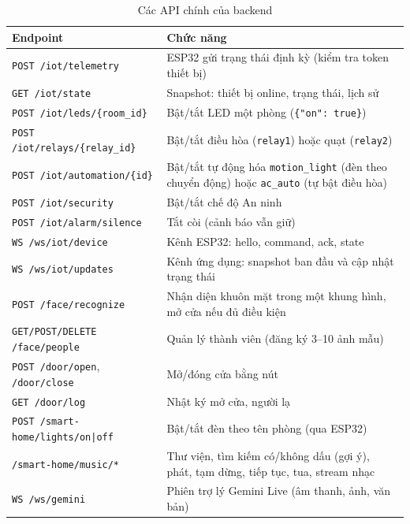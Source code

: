\documentclass[12pt,a4paper]{extarticle}
\newcommand{\hang}{}  %
\begin{document}
\begin{table}[!htb]
\centering
\begin{tabularx}{\linewidth}{|P{5.8cm}|L|}
\hline
\hang \textbf{Endpoint} & \textbf{Chức năng} \\ \hline

\texttt{POST /iot/telemetry} & ESP32 gửi trạng thái định kỳ (kiểm tra token thiết bị) \\ \hline
\texttt{GET /iot/state} & Snapshot: thiết bị online, trạng thái, lịch sử \\ \hline
\texttt{POST /iot/leds/\{room\_id\}} & Bật/tắt LED một phòng (\texttt{\{"on": true\}}) \\ \hline
\texttt{POST /iot/relays/\{relay\_id\}} & Bật/tắt điều hòa (\texttt{relay1}) hoặc quạt (\texttt{relay2}) \\ \hline
\texttt{POST /iot/automation/\{id\}} & Bật/tắt tự động hóa \texttt{motion\_light} (đèn theo chuyển động) hoặc \texttt{ac\_auto} (tự bật điều hòa) \\ \hline
\texttt{POST /iot/security} & Bật/tắt chế độ An ninh \\ \hline
\texttt{POST /iot/alarm/silence} & Tắt còi (cảnh báo vẫn giữ) \\ \hline
\texttt{WS /ws/iot/device} & Kênh ESP32: hello, command, ack, state \\ \hline
\texttt{WS /ws/iot/updates} & Kênh ứng dụng: snapshot ban đầu và cập nhật trạng thái \\ \hline
\texttt{POST /face/recognize} & Nhận diện khuôn mặt trong một khung hình, mở cửa nếu đủ điều kiện \\ \hline
\texttt{GET/POST/DELETE /face/people} & Quản lý thành viên (đăng ký 3--10 ảnh mẫu) \\ \hline
\texttt{POST /door/open}, \texttt{/door/close} & Mở/đóng cửa bằng nút \\ \hline
\texttt{GET /door/log} & Nhật ký mở cửa, người lạ \\ \hline
\texttt{POST /smart-home/lights/on|off} & Bật/tắt đèn theo tên phòng (qua ESP32) \\ \hline
\texttt{/smart-home/music/*} & Thư viện, tìm kiếm có/không dấu (gợi ý), phát, tạm dừng, tiếp tục, tua, stream nhạc \\ \hline
\texttt{WS /ws/gemini} & Phiên trợ lý Gemini Live (âm thanh, ảnh, văn bản) \\ \hline
\end{tabularx}
\caption{Các API chính của backend}
\label{tab:api}
\end{table}
\end{document}
